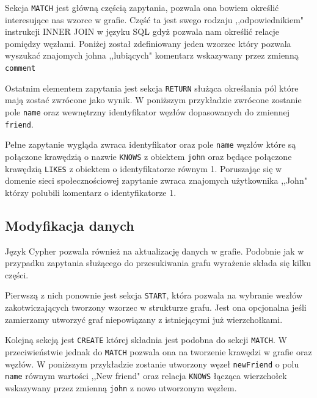 \documentclass[brudnopis]{xmgr}
\begin{document}


Sekcja \texttt{MATCH} jest główną częścią zapytania, pozwala ona bowiem określić interesujące nas wzorce w grafie. Część ta jest swego rodzaju ,,odpowiednikiem" instrukcji INNER JOIN w języku SQL gdyż pozwala nam określić relacje pomiędzy węzłami. Poniżej został zdefiniowany jeden wzorzec który pozwala wyszukać znajomych johna ,,lubiących" komentarz wskazywany przez zmienną \texttt{comment}



Ostatnim elementem zapytania jest sekcja \texttt{RETURN} służąca określania pól które mają zostać zwrócone jako wynik. W poniższym przykładzie zwrócone zostanie pole \texttt{name} oraz wewnętrzny identyfikator węzłów dopasowanych do zmiennej \texttt{friend}.



Pełne zapytanie wygląda zwraca identyfikator oraz pole \texttt{name} węzłów które są połączone krawędzią o nazwie \texttt{KNOWS} z obiektem \texttt{john} oraz będące połączone krawędzią \texttt{LIKES} z obiektem o identyfikatorze równym {1}. Poruszając się w domenie sieci społecznościowej zapytanie zwraca znajomych użytkownika ,,John" którzy polubili komentarz o identyfikatorze {1}.



\subsection{Modyfikacja danych}

Język Cypher pozwala również na aktualizację danych w grafie. Podobnie jak w przypadku zapytania służącego do przesukiwania grafu wyrażenie składa się kilku części.

Pierwszą z nich ponownie jest sekcja \texttt{START}, która pozwala na wybranie wezłów zakotwiczających tworzony wzorzec w strukturze grafu. Jest ona opcjonalna jeśli zamierzamy utworzyć graf niepowiązany z istniejącymi już wierzchołkami.



Kolejną sekcją jest \texttt{CREATE} której składnia jest podobna do sekcji \texttt{MATCH}. W przeciwieństwie jednak do \texttt{MATCH} pozwala ona na tworzenie krawędzi w grafie oraz węzłów. W poniższym przykładzie zostanie utworzony węzeł \texttt{newFriend} o polu \texttt{name} równym wartości ,,New friend" oraz relacja \texttt{KNOWS} łącząca wierzchołek wskazywany przez zmienną \texttt{john} z nowo utworzonym węzłem.
\end{document}
